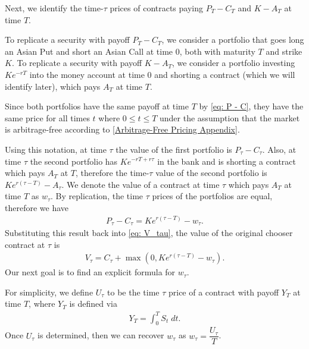 \documentclass[reqno]{amsart}
\begin{document}
Next, we identify the time-$\tau$ prices of contracts paying $P_T - C_T$ and $K - A_T$ at time $T$.

To replicate a security with payoff $P_T - C_T$, we consider a portfolio that goes long an Asian Put and short an Asian Call at time $0$, both with maturity $T$ and strike $K$.
To replicate a security with payoff $K - A_T$,  we consider a portfolio investing $Ke^{-rT}$ into the money account at time 0 and shorting a contract (which we will identify later), which pays $A_T$ at time $T$. 

Since both portfolios have the same payoff at time $T$ by \eqref{eq: P - C},
they have the same price for all times $t$ where $0 \leq t \leq T$ under the assumption that the market is
arbitrage-free according to \ref{Arbitrage-Free Pricing Appendix}.


Using this notation, at time $\tau$ the value of the first portfolio is $P_\tau - C_\tau$.
 Also, at time $\tau$ the second portfolio has $Ke^{-rT + r\tau}$ in the bank and is shorting a contract which pays $A_T$ at $T$, therefore the time-$\tau$ value of the second portfolio is $Ke^{r(\tau - T)} - A_\tau$. We denote the value of a contract at time $\tau$ which pays $A_T$ at time $T$ as $w_\tau$.
By replication, the time $\tau$ prices of the portfolios are equal, therefore we have 
\begin{align}\label{eq: P-C Parity}
     P_\tau - C_\tau = Ke^{r(\tau - T)} - w_\tau.
\end{align}
Substituting this result back into \eqref{eq: V_tau}, the value of the original chooser contract at $\tau$ is
\begin{align} \label{V_tau Asian Chooser}
     V_\tau = C_\tau + \max(0, Ke^{r(\tau - T)} - w_\tau).
\end{align}
Our next goal is to find an explicit formula for $w_\tau$. 

For simplicity, we define $U_\tau$ to be the time $\tau$ price of a contract with payoff $Y_T$ at time $T$, where $Y_T$ is defined via
\begin{align}\label{eq: y}
     Y_T = \int_0^T S_t \; dt.
\end{align}
Once $U_\tau$ is determined, then we can recover $w_\tau$ as $w_\tau = \dfrac{U_\tau}{T}$. 
\end{document}
